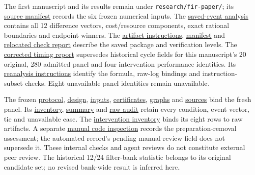 \documentclass[conference]{IEEEtran}
\begin{document}
The first manuscript and its results remain under
\texttt{research/fir-paper/}; its
\href{../../fir-paper/source-manifest.json}{source manifest} records the
six frozen numerical inputs. The
\href{../analysis/analysis.json}{saved-event analysis} contains all 12
difference vectors, cost/resource components, exact rational boundaries
and endpoint winners. The \href{../README.md}{artifact instructions},
\href{../evidence-manifest.json}{manifest} and
\href{../artifact-check.json}{relocated check report} describe the saved
package and verification levels. The
\href{../timing/corrected-timing.json}{corrected timing report}
supersedes historical cycle fields for this manuscript's 20 original,
280 admitted panel and four intervention performance identities. Its
\href{../timing/README.md}{reanalysis instructions} identify the
formula, raw-log bindings and instruction-subset checks. Eight
unavailable panel identities remain unavailable.

The frozen \href{../panel-protocol.json}{protocol},
\href{../panel-design.json}{design},
\href{../panel-inputs.json}{inputs},
\href{../panel-certificates.json}{certificates},
\href{../vendor/graphs-manifest.json}{graphs} and
\href{../sources-manifest.json}{sources} bind the fresh panel. Its
\href{../panel-results.json}{inventory},
\href{../panel-summary.json}{summary} and
\href{../verification/independent-audit.json}{raw audit} retain every
condition, event vector, tie and unavailable case. The
\href{../intervention-results.json}{intervention inventory} binds its
eight rows to raw artifacts. A separate
\href{../intervention-review.md}{manual code inspection} records the
preparation-removal assessment; the automated record's pending
manual-review field does not supersede it. These internal checks and
agent reviews do not constitute external peer review. The historical
12/24 filter-bank statistic belongs to its original candidate set; no
revised bank-wide result is inferred here.
\end{document}
